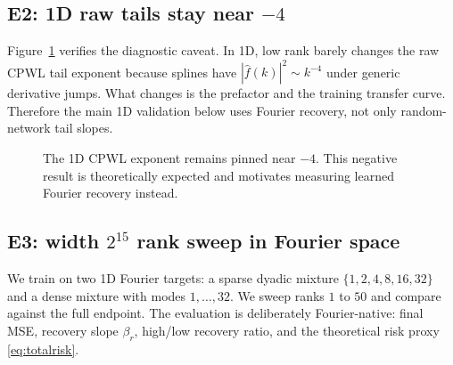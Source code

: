 \documentclass[10pt,twocolumn]{article}
\newcommand{\1}{\mathbf{1}}
\newcommand{\wh}{\widehat}
\begin{document}
\subsection{E2: 1D raw tails stay near $-4$}
Figure~\ref{fig:onedtail} verifies the diagnostic caveat.  In 1D, low rank barely changes the raw CPWL tail exponent because splines have $|\wh f(k)|^2\sim k^{-4}$ under generic derivative jumps.  What changes is the prefactor and the training transfer curve.  Therefore the main 1D validation below uses Fourier recovery, not only random-network tail slopes.

\begin{figure}[t]
\centering
{}
\caption{The 1D CPWL exponent remains pinned near $-4$.  This negative result is theoretically expected and motivates measuring learned Fourier recovery instead.}
\label{fig:onedtail}
\end{figure}

\subsection{E3: width $2^{15}$ rank sweep in Fourier space}
We train on two 1D Fourier targets: a sparse dyadic mixture $\{1,2,4,8,16,32\}$ and a dense mixture with modes $1,\ldots,32$.  We sweep ranks $1$ to $50$ and compare against the full endpoint.  The evaluation is deliberately Fourier-native: final MSE, recovery slope $\beta_r$, high/low recovery ratio, and the theoretical risk proxy \eqref{eq:totalrisk}.
\end{document}
